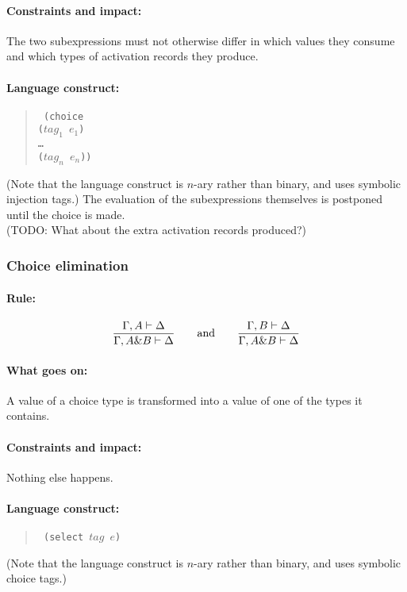 \documentclass[a4paper]{article}
\begin{document}
\paragraph{Constraints and impact:} The two subexpressions must not
otherwise differ in which values they consume and which types of activation
records they produce.

\paragraph{Language construct:}
\begin{quote}\tt
  (choice\\
  \phantom{ }\quad ($\mathit{tag}_1$ $e_1$)\\
  \phantom{ }\quad \ldots\\
  \phantom{ }\quad ($\mathit{tag}_n$ $e_n$))
\end{quote}
(Note that the language construct is $n$-ary rather than binary, and
uses symbolic injection tags.)
The evaluation of the subexpressions themselves is postponed until the
choice is made.
\\(TODO: What about the extra activation records produced?)

\subsubsection{Choice elimination}


\paragraph{Rule:}
$$
{{
  \Gamma, A \vdash \Delta
}\over{
  \Gamma, A \& B \vdash \Delta
}}
\qquad \textrm{and} \qquad
{{
  \Gamma, B \vdash \Delta
}\over{
  \Gamma, A \& B \vdash \Delta
}}
$$

\paragraph{What goes on:} A value of a choice type is transformed into
a value of one of the types it contains.

\paragraph{Constraints and impact:} Nothing else happens.
\paragraph{Language construct:}
\begin{quote}\tt
(select $\mathit{tag}$ $e$)
\end{quote}
(Note that the language construct is $n$-ary rather than binary, and
uses symbolic choice tags.)
\end{document}
